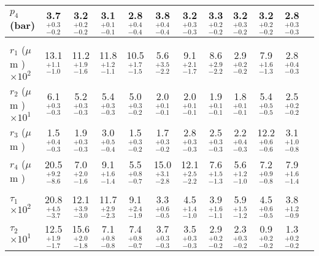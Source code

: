 \documentclass[article,11pt]{emulateapj}
\def\mum{$\mu$m }
\begin{document}
\begin{table*}[!htb]
\begin{scriptsize}
\begin{tabular}{l c c c c c c c c c c c}
              $p_4$ (bar) &   3.7$^{+  0.3}_{-  0.2}$ &   3.2$^{+  0.2}_{-  0.2}$ &   3.1$^{+  0.1}_{-  0.1}$ &   2.8$^{+  0.4}_{-  0.4}$ &   3.8$^{+  0.4}_{-  0.4}$ &   3.2$^{+  0.3}_{-  0.3}$ &   3.3$^{+  0.2}_{-  0.2}$ &   3.2$^{+  0.3}_{-  0.2}$ &   3.2$^{+  0.2}_{-  0.2}$ &   2.8$^{+  0.3}_{-  0.3}$\\[0.05in]
\hline\\[-0.1in]
$r_1$ (\mum)$\times 10^2$ &  13.1$^{+  1.1}_{-  1.0}$ &  11.2$^{+  1.9}_{-  1.6}$ &  11.8$^{+  1.2}_{-  1.1}$ &  10.5$^{+  1.7}_{-  1.5}$ &   5.6$^{+  3.5}_{-  2.2}$ &   9.1$^{+  2.1}_{-  1.7}$ &   8.6$^{+  2.9}_{-  2.2}$ &   2.9$^{+  0.2}_{-  0.2}$ &   7.9$^{+  1.6}_{-  1.3}$ &   2.8$^{+  0.4}_{-  0.3}$\\[0.05in]
$r_2$ (\mum)$\times 10^1$ &   6.1$^{+  0.3}_{-  0.3}$ &   5.2$^{+  0.3}_{-  0.3}$ &   5.4$^{+  0.3}_{-  0.3}$ &   5.0$^{+  0.3}_{-  0.2}$ &   2.0$^{+  0.1}_{-  0.1}$ &   2.0$^{+  0.1}_{-  0.1}$ &   1.9$^{+  0.1}_{-  0.1}$ &   1.8$^{+  0.1}_{-  0.1}$ &   5.4$^{+  0.5}_{-  0.5}$ &   2.5$^{+  0.2}_{-  0.2}$\\[0.05in]
             $r_3$ (\mum) &   1.5$^{+  0.4}_{-  0.3}$ &   1.9$^{+  0.3}_{-  0.3}$ &   3.0$^{+  0.5}_{-  0.4}$ &   1.5$^{+  0.3}_{-  0.2}$ &   1.7$^{+  0.3}_{-  0.2}$ &   2.8$^{+  0.3}_{-  0.3}$ &   2.5$^{+  0.3}_{-  0.3}$ &   2.2$^{+  0.4}_{-  0.3}$ &  12.2$^{+  0.6}_{-  0.6}$ &   3.1$^{+  1.0}_{-  0.8}$\\[0.05in]
             $r_4$ (\mum) &  20.5$^{+  9.2}_{-  8.6}$ &   7.0$^{+  2.0}_{-  1.6}$ &   9.1$^{+  1.6}_{-  1.4}$ &   5.5$^{+  0.8}_{-  0.7}$ &  15.0$^{+  3.1}_{-  2.8}$ &  12.1$^{+  2.5}_{-  2.2}$ &   7.6$^{+  1.5}_{-  1.3}$ &   5.6$^{+  1.2}_{-  1.0}$ &   7.2$^{+  0.9}_{-  0.8}$ &   7.9$^{+  1.6}_{-  1.4}$\\[0.05in]
\hline\\[-0.1in]
    $\tau_1$$\times 10^2$ &  20.8$^{+  4.5}_{-  3.7}$ &  12.1$^{+  3.9}_{-  3.0}$ &  11.7$^{+  2.9}_{-  2.3}$ &   9.1$^{+  2.4}_{-  1.9}$ &   3.3$^{+  0.6}_{-  0.5}$ &   4.5$^{+  1.4}_{-  1.0}$ &   3.9$^{+  1.6}_{-  1.1}$ &   5.9$^{+  1.5}_{-  1.2}$ &   4.5$^{+  0.6}_{-  0.5}$ &   3.8$^{+  1.2}_{-  0.9}$\\[0.05in]
    $\tau_2$$\times 10^1$ &  12.5$^{+  1.9}_{-  1.7}$ &  15.6$^{+  2.0}_{-  1.8}$ &   7.1$^{+  0.8}_{-  0.8}$ &   7.4$^{+  0.8}_{-  0.7}$ &   3.7$^{+  0.3}_{-  0.3}$ &   3.5$^{+  0.3}_{-  0.3}$ &   2.9$^{+  0.2}_{-  0.2}$ &   2.3$^{+  0.3}_{-  0.2}$ &   0.9$^{+  0.2}_{-  0.2}$ &   1.3$^{+  0.2}_{-  0.2}$\\[0.05in]

\end{tabular}
\end{scriptsize}
\end{table*}
\end{document}
